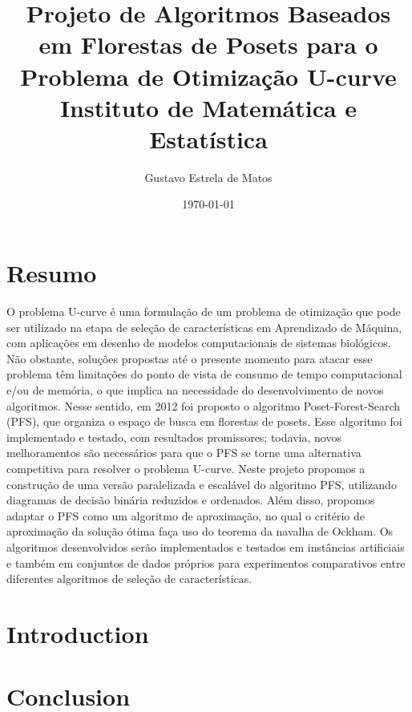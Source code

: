 \documentclass[12pt, twoside]{report}
\title{
    {Projeto de Algoritmos Baseados em Florestas de Posets para o 
     Problema de Otimização U-curve} \\
    {\large Instituto de Matemática e Estatística} \\
}
\author{Gustavo Estrela de Matos}
\date{\today}
\begin{document}
\maketitle

\chapter*{Resumo}
O problema U-curve é uma formulação de um problema de otimização que 
pode ser utilizado na etapa de seleção de características em Aprendizado
de Máquina, com aplicações em desenho de modelos computacionais de 
sistemas biológicos. Não obstante, soluções propostas até o presente 
momento para atacar esse problema têm limitações do ponto de vista de 
consumo de tempo computacional e/ou de memória, o que implica na 
necessidade do desenvolvimento de novos algoritmos. Nesse sentido, em 
2012 foi proposto o algoritmo Poset-Forest-Search (PFS), que organiza o
espaço de busca em florestas de posets. Esse algoritmo foi implementado 
e testado, com resultados promissores; todavia, novos melhoramentos são
necessários para que o PFS se torne uma alternativa competitiva para 
resolver o problema U-curve. Neste projeto propomos a construção de uma 
versão paralelizada e escalável do algoritmo PFS, utilizando diagramas 
de decisão binária reduzidos e ordenados. Além disso, propomos adaptar 
o PFS como um algoritmo de aproximação, no qual o critério de 
aproximação da solução ótima faça uso do teorema da navalha de Ockham. 
Os algoritmos desenvolvidos serão implementados e testados em instâncias
artificiais e também em conjuntos de dados próprios para experimentos 
comparativos entre diferentes algoritmos de seleção de características.

\tableofcontents

\chapter{Introduction}


\chapter{Conclusion}

\end{document}
